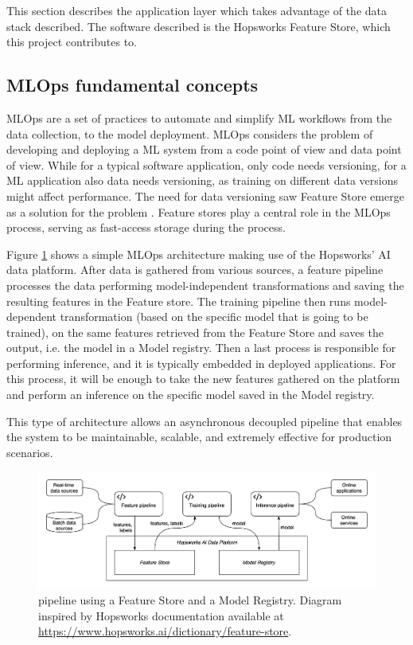 This section describes the application layer which takes advantage of the data stack described. The software described is the Hopsworks Feature Store, which this project contributes to.

\subsection{MLOps fundamental concepts}

\gls{MLOps} are a set of practices to automate and simplify \gls{ML} workflows from the data collection, to the model deployment. \gls{MLOps} considers the problem of developing and deploying a \gls{ML} system from a code point of view and data point of view. While for a typical software application, only code needs versioning, for a \gls{ML} application also data needs versioning, as training on different data versions might affect performance. The need for data versioning saw Feature Store emerge as a solution for the problem \cite{MeetMichelangeloUbers2017}. Feature stores play a central role in the \gls{MLOps} process, serving as fast-access storage during the process.

Figure \ref{fig:mlops} shows a simple \gls{MLOps} architecture making use of the Hopsworks' AI data platform. After data is gathered from various sources, a feature pipeline processes the data performing model-independent transformations and saving the resulting features in the Feature store. The training pipeline then runs model-dependent transformation (based on the specific model that is going to be trained), on the same features retrieved from the Feature Store and saves the output, i.e. the model in a Model registry. Then a last process is responsible for performing inference, and it is typically embedded in deployed applications. For this process, it will be enough to take the new features gathered on the platform and perform an inference on the specific model saved in the Model registry.

This type of architecture allows an asynchronous decoupled pipeline that enables the system to be maintainable, scalable, and extremely effective for production scenarios.

\begin{figure}[!ht]
    \begin{center}
      \includegraphics[width=\textwidth]{figures/2-background/MLOps.png}
    \end{center}
    \caption[Feature Store in an MLOps pipeline]{ pipeline using a Feature Store and a Model Registry. Diagram inspired by Hopsworks documentation available at \url{https://www.hopsworks.ai/dictionary/feature-store}.}
    \label{fig:mlops}
\end{figure}


